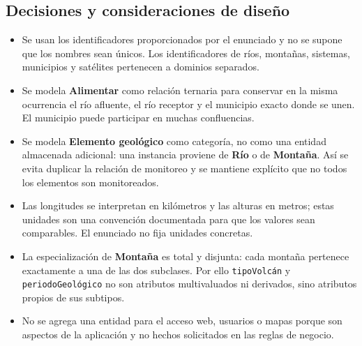 \subsection{Decisiones y consideraciones de diseño}

\begin{itemize}
  \item Se usan los identificadores proporcionados por el enunciado y no se
        supone que los nombres sean únicos. Los identificadores de ríos,
        montañas, sistemas, municipios y satélites pertenecen a dominios
        separados.
  \item Se modela \textbf{Alimentar} como relación ternaria para conservar en
        la misma ocurrencia el río afluente, el río receptor y el municipio
        exacto donde se unen. El municipio puede participar en muchas
        confluencias.
  \item Se modela \textbf{Elemento geológico} como categoría, no como una
        entidad almacenada adicional: una instancia proviene de \textbf{Río}
        o de \textbf{Montaña}. Así se evita duplicar la relación de monitoreo y
        se mantiene explícito que no todos los elementos son monitoreados.
  \item Las longitudes se interpretan en kilómetros y las alturas en metros;
        estas unidades son una convención documentada para que los valores
        sean comparables. El enunciado no fija unidades concretas.
  \item La especialización de \textbf{Montaña} es total y disjunta: cada
        montaña pertenece exactamente a una de las dos subclases. Por ello
        \texttt{tipoVolcán} y \texttt{periodoGeológico} no son atributos
        multivaluados ni derivados, sino atributos propios de sus subtipos.
  \item No se agrega una entidad para el acceso web, usuarios o mapas porque
        son aspectos de la aplicación y no hechos solicitados en las reglas de
        negocio.
\end{itemize}
